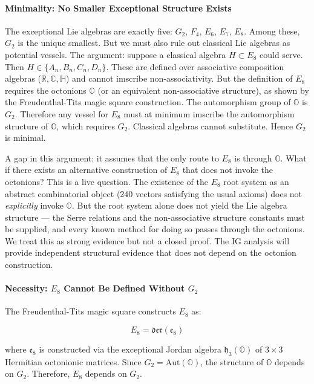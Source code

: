 \documentclass[12pt,a4paper]{article}
\begin{document}
\paragraph{Minimality: No Smaller Exceptional Structure Exists}

The exceptional Lie algebras are exactly five: $G_2$, $F_4$, $E_6$, $E_7$, $E_8$. Among these, $G_2$ is the unique smallest. But we must also rule out classical Lie algebras as potential vessels. The argument: suppose a classical algebra $H \subset E_8$ could serve. Then $H \in \{A_n, B_n, C_n, D_n\}$. These are defined over associative composition algebras ($\mathbb{R}, \mathbb{C}, \mathbb{H}$) and cannot imscribe non-associativity. But the definition of $E_8$ requires the octonions $\mathbb{O}$ (or an equivalent non-associative structure), as shown by the Freudenthal-Tits magic square construction. The automorphism group of $\mathbb{O}$ is $G_2$. Therefore any vessel for $E_8$ must at minimum imscribe the automorphism structure of $\mathbb{O}$, which requires $G_2$. Classical algebras cannot substitute. Hence $G_2$ is minimal.

A gap in this argument: it assumes that the only route to $E_8$ is through $\mathbb{O}$. What if there exists an alternative construction of $E_8$ that does not invoke the octonions? This is a live question. The existence of the $E_8$ root system as an abstract combinatorial object (240 vectors satisfying the usual axioms) does not \emph{explicitly} invoke $\mathbb{O}$. But the root system alone does not yield the Lie algebra structure --- the Serre relations and the non-associative structure constants must be supplied, and every known method for doing so passes through the octonions. We treat this as strong evidence but not a closed proof. The IG analysis will provide independent structural evidence that does not depend on the octonion construction.

\paragraph{Necessity: $E_8$ Cannot Be Defined Without $G_2$}

The Freudenthal-Tits magic square constructs $E_8$ as:

\[E_8 = \mathfrak{der}(\mathfrak{e}_8)\]

where $\mathfrak{e}_8$ is constructed via the exceptional Jordan algebra $\mathfrak{h}_3(\mathbb{O})$ of $3 \times 3$ Hermitian octonionic matrices. Since $G_2 = \text{Aut}(\mathbb{O})$, the structure of $\mathbb{O}$ depends on $G_2$. Therefore, $E_8$ depends on $G_2$.
\end{document}
